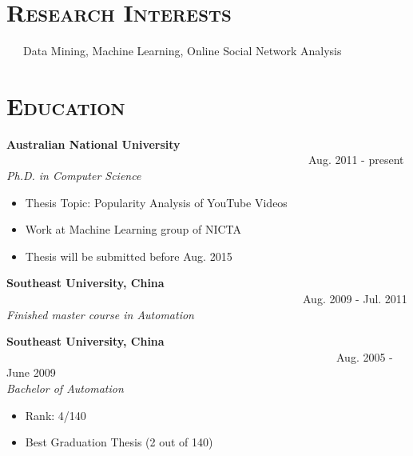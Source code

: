 \begin{resume}




\section{\textsc{Research  Interests}}
\ \ \ Data Mining, Machine Learning, Online Social Network Analysis

\section{\textsc{Education}}

\textbf{Australian National University}  \ \  \ \ \ \ \ \ \ \ \ \ \ \ \ \ \ \ \ \ \ \ \ \ \ \ \ \ \ \ \ \ \ \ \ \ \ \ \ \ \ \ \ \ \ \ \ \ \ \ \ \ \ \   Aug. 2011 - present \\
\emph{Ph.D. in Computer Science} 


\begin{itemize}
  \item Thesis Topic: Popularity Analysis of YouTube Videos
  \item Work at Machine Learning group of NICTA
  \item Thesis will be submitted before Aug. 2015
 \end{itemize}

\textbf{Southeast University, China} \ \ \ \ \ \ \ \ \ \ \ \ \ \ \ \ \ \ \ \ \ \ \ \ \ \ \ \ \ \ \ \ \ \ \ \ \ \ \ \ \ \ \ \ \ \ \ \ \  \ \ \ \   Aug. 2009 - Jul. 2011 \\ 
\emph{Finished master course in Automation}

\textbf{Southeast University, China} \ \ \ \ \ \ \ \ \ \ \ \ \ \ \ \  \ \ \ \ \ \ \ \ \ \ \ \ \ \ \ \ \ \ \ \ \ \ \ \ \ \ \ \ \ \ \  \ \ \ \ \ \ \ \ \ \ \ \ Aug. 2005 - June 2009 \\ 
\emph{Bachelor of Automation} 

 \begin{itemize}
   \item Rank: 4/140
   \item Best Graduation Thesis (2 out of 140)
 \end{itemize}



\end{resume}
